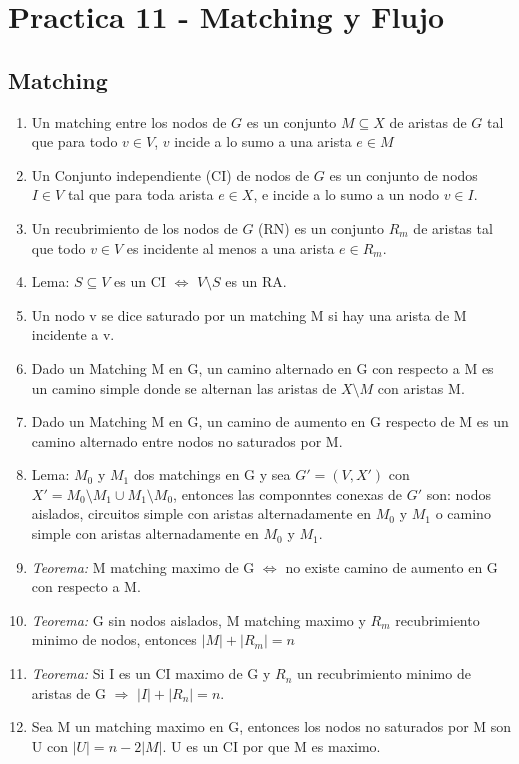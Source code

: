 \section{Practica 11 - Matching y Flujo}
\subsection{Matching}
\begin{enumerate}
\item Un matching entre los nodos de $G$ es un conjunto $M \subseteq X$ de aristas de $G$ tal que para todo $v \in V$, $v$ incide a lo sumo a una arista $e \in M$
\item Un Conjunto independiente (CI) de nodos de $G$ es un conjunto de nodos $I \in V$ tal que para toda arista $e \in X$, e incide a lo sumo a un nodo $v \in I$.
\item Un recubrimiento de los nodos de $G$ (RN) es un conjunto $R_{m}$ de aristas tal que todo $v \in V$ es incidente al menos a una arista $e \in R_{m}$.
\item Lema: $S \subseteq V$ es un CI $\iff$ $V \setminus S$ es un RA.
\item Un nodo v se dice saturado por un matching M si hay una arista de M incidente a v.
\item Dado un Matching M en G, un camino alternado en G con respecto a M es un camino simple donde se alternan las aristas de $X \setminus M$ con aristas M.
\item Dado un Matching M en G, un camino de aumento en G respecto de M es un camino alternado entre nodos no saturados por M.
\item Lema: $M_{0}$ y $M_{1}$ dos matchings en G y sea $G'=(V,X')$ con $X'=M_{0} \setminus M_{1} \cup M_{1} \setminus M_{0}$, entonces las componntes conexas de $G'$ son: nodos aislados, circuitos simple con aristas alternadamente en $M_{0}$ y $M_{1}$ o camino simple con aristas alternadamente en $M_{0}$ y $M_{1}$.
\item \textit{Teorema:} M matching maximo de G $\iff$ no existe camino de aumento en G con respecto a M.
\item \textit{Teorema:} G sin nodos aislados, M matching maximo y $R_{m}$ recubrimiento minimo de nodos, entonces $|M|+|R_{m}|=n$
\item \textit{Teorema:} Si I es un CI maximo de G y $R_{n}$ un recubrimiento minimo de aristas de G $\Rightarrow$ $|I|+|R_{n}|=n$.
\item Sea M un matching maximo en G, entonces los nodos no saturados por M son U con $|U|=n-2|M|$. U es un CI por que M es maximo.
\end{enumerate}
